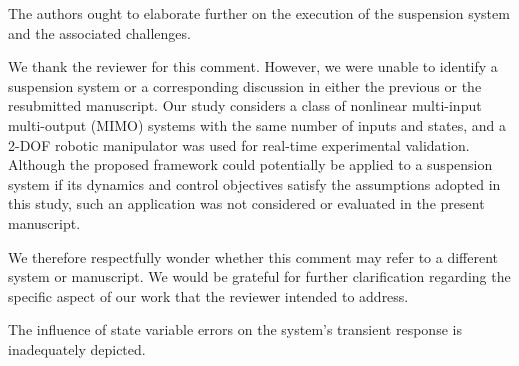 \documentclass[12pt,english]{reviewresponse}
\begin{document}
% 
\begin{revcomment}[2][1]{}
	The authors ought to elaborate further on the execution of the suspension system and the associated challenges.
\end{revcomment}

\begin{revresponse}
	We thank the reviewer for this comment. 
  However, we were unable to identify a suspension system or a corresponding discussion in either the previous or the resubmitted manuscript. 
  Our study considers a class of nonlinear multi-input multi-output (MIMO) systems with the same number of inputs and states, and a 2-DOF robotic manipulator was used for real-time experimental validation. 
  Although the proposed framework could potentially be applied to a suspension system if its dynamics and control objectives satisfy the assumptions adopted in this study, such an application was not considered or evaluated in the present manuscript.

  \bigskip

  We therefore respectfully wonder whether this comment may refer to a different system or manuscript. 
  We would be grateful for further clarification regarding the specific aspect of our work that the reviewer intended to address.
\end{revresponse}

% 
\begin{revcomment}[2][1]{}
	The influence of state variable errors on the system's transient response is inadequately depicted.
\end{revcomment}
\end{document}
